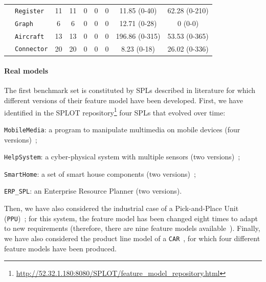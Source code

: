 \begin{tikzborder}{\cite{Gargantini16:validation}}
\begin{tikzborder}{\cite{gargantini_combinatorial_2017}}
\begin{tikzborder}{\cite{gargantini_combinatorial_2017}}
\begin{tikzborder}{\cite{garn2019}}
\begin{tikzborder}{\cite{arcaini2019achieving}}
\begin{table}[!htb]
{\begin{tabular}{clcc|ccccc}
				& {\tt Register} & 11 & 11 & 0 & 0 & 0 & 11.85 (0-40) & 62.28 (0-210)\\
				& {\tt Graph} & 6 & 6 & 0 & 0 & 0 & 12.71 (0-28) & 0 (0-0)\\
				&{\tt Aircraft} & 13 & 13 & 0 & 0 & 0 & 196.86 (0-315) & 53.53 (0-365)\\
				& {\tt Connector} & 20 & 20 & 0 & 0 & 0 & 8.23 (0-18) & 26.02 (0-336)\\
				\bottomrule
			\end{tabular}
		}
		\label{tab:benchmarks}
	\end{table}
	
	\paragraph{Real models}
	\bb The first benchmark set \benchReal is constituted by SPLs described in literature for which different versions of their feature model have been developed. First, we have identified in the SPLOT repository\footnote{\url{http://52.32.1.180:8080/SPLOT/feature_model_repository.html}} four SPLs that evolved over time:
	\begin{compactitem}
		\item {\tt MobileMedia}: a program to manipulate multimedia on mobile devices (four versions)~\cite{multimediaPaper};
		\item {\tt HelpSystem}: a cyber-physical system with multiple sensors (two versions)~\cite{helpSystemPaper};
		\item {\tt SmartHome}: a set of smart house components (two versions)~\cite{smartHomePaper};
		\item {\tt ERP\_SPL}: an Enterprise Resource Planner (two versions).
	\end{compactitem}
	Then, we have also considered the industrial case of a Pick-and-Place Unit ({\tt PPU})~\cite{Burdek2016}; for this system, the feature model has been changed eight times to adapt to new requirements (therefore, there are nine feature models available~\cite{Burdek2016}). Finally, we have also considered the product line model of a {\tt CAR}~\cite{Pleuss2012}, for which four different feature models have been produced.
	

\end{tikzborder}
\end{tikzborder}
\end{tikzborder}
\end{tikzborder}
\end{tikzborder}
